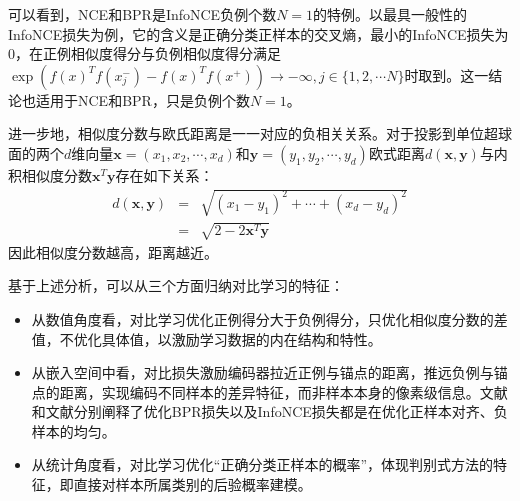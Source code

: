 可以看到，NCE和BPR是InfoNCE负例个数$N=1$的特例。以最具一般性的InfoNCE损失为例，它的含义是正确分类正样本的交叉熵\cite{Oord:2018:arxiv}，最小的InfoNCE损失为0，在正例相似度得分与负例相似度得分满足$\exp(f(x)^Tf(x^-_j)- f(x)^Tf(x^+))\rightarrow -\infty, j \in \{1,2,\cdots N\}$时取到。这一结论也适用于NCE和BPR，只是负例个数$N=1$。

进一步地，相似度分数与欧氏距离是一一对应的负相关关系。对于投影到单位超球面的两个$d$维向量$\mathbf{x} = (x_1,x_2,\cdots,x_d)$和$\mathbf{y} = (y_1,y_2,\cdots,y_d)$欧式距离$d(\mathbf{x},\mathbf{y})$与内积相似度分数$\mathbf{x}^T\mathbf{y}$存在如下关系：
\begin{eqnarray}
d(\mathbf{x},\mathbf{y}) &=& \sqrt{(x_1-y_1)^2+\cdots +(x_d-y_d)^2} \nonumber \\
&=&\sqrt{2-2\mathbf{x}^T\mathbf{y}} \nonumber
\end{eqnarray}
因此相似度分数越高，距离越近。

基于上述分析，可以从三个方面归纳对比学习的特征：
\begin{itemize}
\item 从数值角度看，对比学习优化正例得分大于负例得分，只优化相似度分数的差值，不优化具体值，以激励学习数据的内在结构和特性。
\item 从嵌入空间中看，对比损失激励编码器拉近正例与锚点的距离，推远负例与锚点的距离，实现编码不同样本的差异特征，而非样本本身的像素级信息。文献\cite{Wang:2022:KDD}和文献\cite{Wang:2020:ICML}分别阐释了优化BPR损失以及InfoNCE损失都是在优化正样本对齐、负样本的均匀。
\item 从统计角度看，对比学习优化“正确分类正样本的概率”\cite{Oord:2018:arxiv}，体现判别式方法的特征，即直接对样本所属类别的后验概率建模。
\end{itemize}

